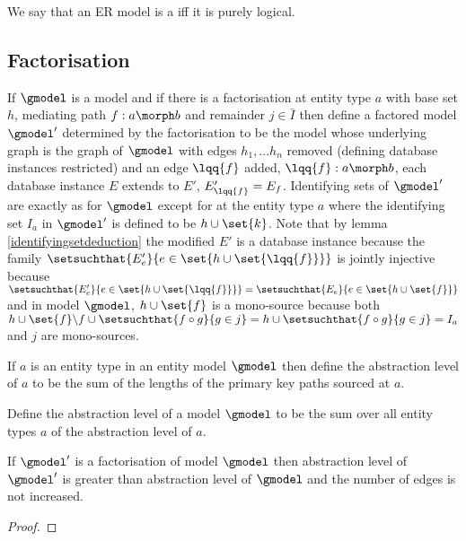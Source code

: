 \noindent
We say that an ER model is a  iff it is purely logical.

\subsection{Factorisation}
\begin{definition}
If $\gmodel$ is a model and if there is a factorisation at entity type $a$ with
base set $h$, mediating path $f: a \morph b$ and remainder $j \in \bar{I}$ then define
a factored model $\gmodel'$ determined by the factorisation to be the model
whose underlying graph is the graph of $\gmodel$ with edges $h_1,...h_n$ removed 
(defining database instances restricted) and an edge $\lqq{f}$ added, $\lqq{f}:a \morph b$, each database instance $E$ extends to $E'$, $E'_{\lqq{f}} = E_f$.
Identifying sets of $\gmodel'$ are exactly as for $\gmodel$ except for at the entity
type $a$ where the identifying set $I_a$ in $\gmodel'$ is defined to be $h \cup \set{k}$.
Note that by lemma \ref{identifyingsetdeduction} the modified $E'$ is a database instance because the family 
$\setsuchthat{E'_e}{e \in \set{h \cup \set{\lqq{f}}}}$ is jointly injective because 
$\setsuchthat{E'_e}{e \in \set{h \cup \set{\lqq{f}}}} =\setsuchthat{E_e}{e \in \set{h \cup \set{f}}}$
and in model $\gmodel$, $h \cup \set{f}$ is a mono-source because both
$h \cup \set{f} \backslash f \cup \setsuchthat{f \circ g}{g \in j}
=h  \cup \setsuchthat{f \circ g}{g \in j}=I_a$ and $j$ are  mono-sources.


\end{definition}

\begin{definition}
If $a$ is an entity type in an entity model $\gmodel$ then define the abstraction
level of $a$ to be the sum of the lengths of the primary key paths sourced at $a$.
\end{definition}


\begin{definition}
Define  the abstraction level of a model $\gmodel$ to be
the sum over all entity types $a$ of the abstraction level of $a$.
\end{definition}

\begin{lemma}
If $\gmodel'$ is a factorisation of model $\gmodel$ then abstraction level 
of $\gmodel'$ is greater than abstraction level of $\gmodel$ and the number of edges
is not increased. 
\end{lemma}
\begin{proof}
\end{proof}


